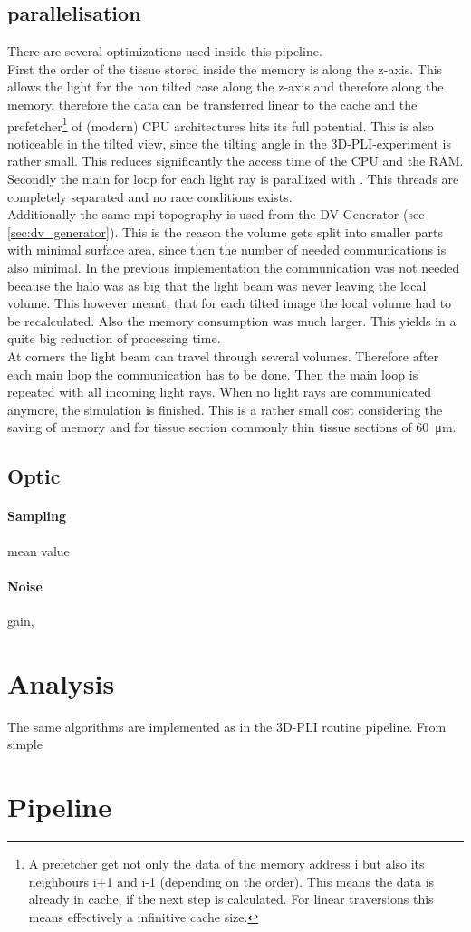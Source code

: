 \subsection{parallelisation}
% 
There are several optimizations used inside this pipeline.
\\
% 
First the order of the tissue stored inside the memory is along the z-axis.
This allows the light for the non tilted case along the z-axis and therefore along the memory.
therefore the data can be transferred linear to the cache and the prefetcher\footnote{A prefetcher get not only the data of the memory address i but also its neighbours i+1 and i-1 (depending on the order).
This means the data is already in cache, if the next step is calculated.
For linear traversions this means effectively a infinitive cache size.} of (modern) \ac{CPU} architectures hits its full potential.
This is also noticeable in the tilted view, since the tilting angle in the \ac{3D-PLI}-experiment is rather small.
This reduces significantly the access time of the \ac{CPU} and the \ac{RAM}.\\
% 
Secondly the main for loop for each light ray is parallized with \openmp{}.
This threads are completely separated and no race conditions exists.\\
% 
Additionally the same mpi topography is used from the DV-Generator (see \cref{sec:dv_generator}).
This is the reason the volume gets split into smaller parts with minimal surface area, since then the number of needed communications is also minimal.
In the previous \simpli{} implementation the communication was not needed because the halo was as big that the light beam was never leaving the local volume.
This however meant, that for each tilted image the local volume had to be recalculated.
Also the memory consumption was much larger.
This yields in a quite big reduction of processing time.
\\
% 
At corners the light beam can travel through several \mpi{} volumes.
Therefore after each main loop the communication has to be done.
Then the main loop is repeated with all incoming light rays.
When no light rays are communicated anymore, the simulation is finished.
This is a rather small cost considering the saving of memory and for tissue section commonly thin tissue sections of \SI{60}{\micro\meter}.
% 
% 
\subsection{Optic}
\paragraph{Sampling}
mean value
% 
\paragraph{Noise}
gain, 
% 
\section{Analysis}
% 
The same algorithms are implemented as in the \ac{3D-PLI} routine pipeline.
From simple
% 
\section{Pipeline}
% 